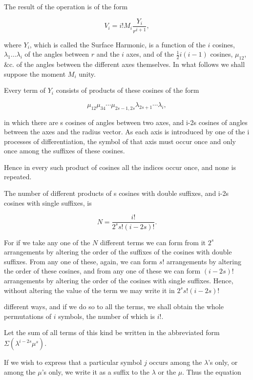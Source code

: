 \documentclass[11pt,a4paper]{article}
\begin{document}
The result of the operation is of the form

\begin{equation}\tag{14}
V_i=i!M_i\frac{Y_i}{r^{i+1}},
\end{equation}

where $Y_i$, which is called the Surface Harmonic, is a function of the $i$ cosines, $\lambda_1\ldots\lambda_i$ of the angles between $r$ and the $i$ axes, and of the $\frac{1}{2}i(i-1)$ cosines, $\mu_{12}$, \&c. of the angles between the different axes themselves. In what follows we shall suppose the moment $M_i$ unity.

Every term of  $Y_i$  consists of products of these cosines of the form

\[
\mu_{12}\mu_{34}\cdots\mu_{2s-1,2s}\lambda_{2s+1}\cdots\lambda_i,
\]

in which there are s cosines of angles between two axes, and i-2s cosines of angles between the axes and the radius vector. As each axis is introduced by one of the i processes of differentiation, the symbol of that axis must occur once and only once among the suffixes of these cosines.

Hence in every such product of cosines all the indices occur once, and none is repeated.

The number of different products of s cosines with double suffixes, and i-2s cosines with single suffixes, is

\begin{equation}\tag{15}
N=\frac{i!}{2^s s!(i-2s)!}.
\end{equation}

For if we take any one of the $N$ different terms we can form from it $2^s$ arrangements by altering the order of the suffixes of the cosines with double suffixes. From any one of these, again, we can form $s!$ arrangements by altering the order of these cosines, and from any one of these we can form $(i-2s)!$ arrangements by altering the order of the cosines with single suffixes. Hence, without altering the value of the term we may write it in $2^s s!(i-2s)!$

different ways, and if we do so to all the terms, we shall obtain the whole permutations of $i$ symbols, the number of which is $i!$.

Let the sum of all terms of this kind be written in the abbreviated form $\Sigma(\lambda^{i-2s}\mu^s)$.

If we wish to express that a particular symbol $j$ occurs among the $\lambda$'s only, or among the $\mu$'s only, we write it as a suffix to the $\lambda$ or the $\mu$. Thus the equation
\end{document}
